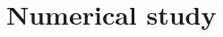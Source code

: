 \documentclass[12pt]{article} %
\DeclareMathOperator{\mytr}{tr}
\newcommand{\bX}{\mathbf{X}}
\newcommand{\bfsym}[1]{\ensuremath{\boldsymbol{#1}}}
\def\bSigma {\bfsym {\Sigma}}
\def\bTheta {\bfsym {\Theta}}
\theoremstyle{definition}
\begin{document}





\section{Numerical study}\label{numerical}
\end{document}
